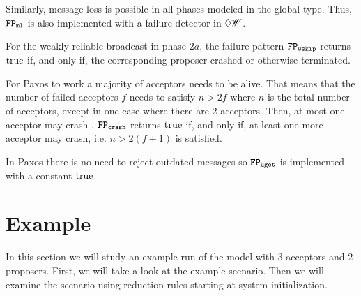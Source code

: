 Similarly, message loss is possible in all phases modeled in the global type.
Thus, $\mathtt{FP_{ml}}$ is also implemented with a failure detector in $\Diamond\mathscr{W}$.

For the weakly reliable broadcast in phase $2a$, the failure pattern $\mathtt{FP_{wskip}}$ returns $\operatorname{true}$ if, and only if, the corresponding proposer crashed or otherwise terminated.

For Paxos to work a majority of acceptors needs to be alive.
That means that the number of failed acceptors $f$ needs to satisfy $n > 2f$ where $n$ is the total number of acceptors, except in one case where there are 2 acceptors.
Then, at most one acceptor may crash \cite{lower_bounds}.
$\mathtt{FP_{crash}}$ returns $\operatorname{true}$ if, and only if, at least one more acceptor may crash, i.e. $n > 2(f + 1)$ is satisfied.

In Paxos there is no need to reject outdated messages so $\mathtt{FP_{uget}}$ is implemented with a constant $\operatorname{true}$.


\section{Example}
In this section we will study an example run of the model with $3$ acceptors and $2$ proposers.
First, we will take a look at the example scenario.
Then we will examine the scenario using reduction rules starting at system initialization.

